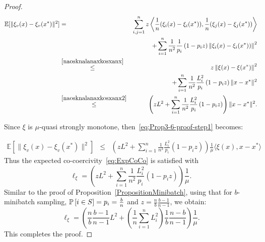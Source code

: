 \documentclass{article}
\begin{document}
\begin{proof}
\begin{eqnarray}
\mathbb{E}[\|\xi_v(x) - \xi_v(x^*)\|^2] 
&= &  \sum_{i,j=1}^n z \left\langle \frac{1}{n}(\xi_i(x) - \xi_i(x^*)), \frac{1}{n}(\xi_j(x) - \xi_j(x^*)) \right\rangle \notag\\
& &+ \sum_{i=1}^n\frac{1}{n^2} \frac{1}{p_i}\left(1 -p_i z \right) \left\| \xi_i(x) - \xi_i(x^*))\right\|^2 \notag\\
& \overset{\eqref{naosknalanaxkosxanx}}{\leq} &  z \left\| \xi(x) - \xi(x^*)\right\|^2 \notag\\
& &+  \sum_{i=1}^n\frac{1}{n^2} \frac{L_i^2 }{p_i}\left(1 -p_i z \right) \|x-x^*\|^2 \notag\\
& \overset{\eqref{naosknalanaxkosxanx2}}{\leq} & \left(z L^2 + \sum_{i=1}^n\frac{1}{n^2} \frac{L_i^2 }{p_i}\left(1 -p_i z \right)  \right)  \|x-x^*\|^2. \label{eq:Prop3-6-proof-step1}
\end{eqnarray}

Since $\xi$ is $\mu$-quasi strongly monotone, then~\eqref{eq:Prop3-6-proof-step1} becomes:

\begin{eqnarray}
\mathbb{E}[\|\xi_v(x) - \xi_v(x^*)\|^2] 
& \leq & \left(z L^2 + \sum_{i=1}^n\frac{1}{n^2} \frac{L_i^2 }{p_i}\left(1 -p_i z \right)  \right) \frac{1}{\mu}\langle\xi(x),x-x^*\rangle
\end{eqnarray}
Thus the expected co-coercivity~\eqref{eq:ExpCoCo} is satisfied with
\begin{equation}
\ell_{\xi} =  \left(z L^2 + \sum_{i=1}^n\frac{1}{n^2} \frac{L_i^2 }{p_i}\left(1 -p_i z \right)  \right) \frac{1}{\mu}.
\end{equation}
Similar to the proof of Proposition~\ref{PropositionMinibatch}, using that for  $b$-minibatch sampling, $\mathbb{P} \left[ i\in S\right] = p_i = \frac{b}{n}$ and  $z =\frac{n}{b}\frac{b-1}{n-1}$, we obtain:
\begin{equation}
\ell_\xi = \left(\frac{n}{b}\frac{b-1}{n-1}L^2+ \left( \frac{1}{n} \sum_{i=1}^n L_i^2 \right)\frac{1}{b}\frac{n-b}{n-1}  \right)\frac{1}{\mu}.
\end{equation}
This completes the proof.
\end{proof}
\end{document}
